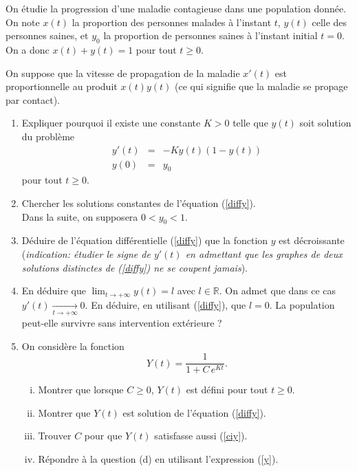 \begin{exo}
    On étudie la progression d'une maladie contagieuse dans une population donnée. On note $x(t)$ la
    proportion des personnes malades à l'instant $t$, $y(t)$ celle des personnes saines, et $y_0$ la proportion de personnes saines à l'instant initial $t=0$. On a donc
    $x(t) + y(t) = 1$ pour tout $t \geq 0$.

    On suppose que la vitesse de propagation de la maladie $x'(t)$ est proportionnelle
    au produit $x(t)y(t)$ (ce qui signifie que la maladie se propage par contact).
    \begin{enumerate}
        \item Expliquer pourquoi il existe une constante $K>0$ telle que $y(t)$ soit solution du problème
        \begin{eqnarray}
            y'(t) &=& -K y(t)(1-y(t)) \label{diffy}\\
            y(0)  &=& y_0\label{ciy}
        \end{eqnarray}
        pour tout $t \geq 0$.
        \item Chercher les solutions constantes de l'équation (\ref{diffy}).\\

        \noindent Dans la suite, on supposera $0 < y_0 < 1$.
        \item Déduire de l'équation différentielle (\ref{diffy}) que la fonction $y$ est décroissante ({\it indication: étudier le signe de $y'(t)$ en admettant que les graphes de
        deux solutions distinctes de (\ref{diffy}) ne se coupent jamais}).
        \item En déduire que $\lim_{t \rightarrow +\infty} y(t) = l$ avec $l \in \mathbb{R}$. On admet que dans ce cas
        $ y'(t)\xrightarrow[t\to +\infty]{}0$. En déduire, en utilisant (\ref{diffy}), que $l=0$.
        La population peut-elle survivre sans intervention extérieure ?
        \item On considère la fonction
        \begin{equation}
            Y(t) = \frac{1}{ 1 + C\,e^{Kt} } \label{y}.
        \end{equation}
        \begin{enumerate}[(i)]
            \item Montrer que lorsque $C \ge 0$, $Y(t)$ est défini pour tout $t \geq 0$.
            \item Montrer que $Y(t)$ est solution de l'équation (\ref{diffy}). 
            \item Trouver $C$ pour que $Y(t)$ satisfasse aussi (\ref{ciy}). %
            \item Répondre à la question (d) en utilisant l'expression (\ref{y}).
        \end{enumerate}
    \end{enumerate}
\end{exo}

